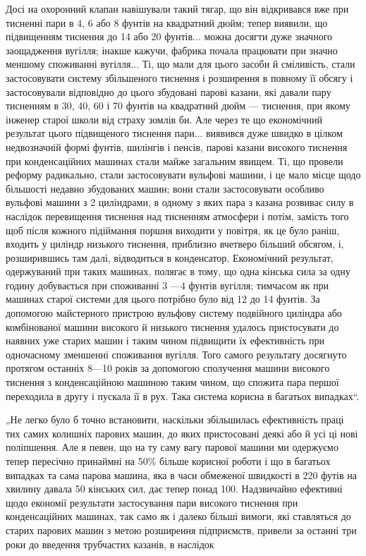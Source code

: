 \parcont{}  %
Досі на охоронний клапан навішували такий тягар, що він відкривався вже при тисненні пари в 4, 6 або
8 фунтів на квадратний
дюйм; тепер виявили, що підвищенням тиснення до 14 або 20 фунтів... можна досягти дуже значного
заощадження вугілля; інакше
кажучи, фабрика почала працювати при значно меншому споживанні вугілля... Ті, що мали для цього
засоби й сміливість, стали
застосовувати систему збільшеного тиснення і розширення в повному її обсягу і застосовували
відповідно до цього збудовані парові казани, які давали пару тисненням в 30, 40, 60 і 70 фунтів на
квадратний дюйм — тиснення, при якому інженер старої школи
від страху зомлів би. Але через те що економічний результат
цього підвищеного тиснення пари... виявився дуже швидко в цілком недвозначній формі фунтів, шилінгів
і пенсів, парові казани
високого тиснення при конденсаційних машинах стали майже загальним явищем. Ті, що провели реформу
радикально, стали застосовувати вульфові машини, і це мало місце щодо більшості недавно
збудованих машин; вони стали застосовувати особливо вульфові
машини з 2 циліндрами, в одному з яких пара з казана розвиває силу в наслідок перевищення тиснення
над тисненням атмосфери і потім, замість того щоб після кожного підіймання поршня
виходити у повітря, як це було раніш, входить у циліндр
низького тиснення, приблизно вчетверо більший обсягом, і, розширившись там далі, відводиться в
конденсатор. Економічний
результат, одержуваний при таких машинах, полягає в тому, що
одна кінська сила за одну годину добувається при споживанні
3 —4 фунтів вугілля; тимчасом як при машинах старої системи
для цього потрібно було від 12 до 14 фунтів. За допомогою
майстерного пристрою вульфову систему подвійного циліндра
або комбінованої машини високого й низького тиснення удалось
пристосувати до наявних уже старих машин і таким чином підвищити їх ефективність при одночасному
зменшенні споживання
вугілля. Того самого результату досягнуто протягом останніх
8—10 років за допомогою сполучення машини високого тиснення
з конденсаційною машиною таким чином, що спожита пара першої переходила в другу і пускала її в рух.
Така система корисна
в багатьох випадках“.

„Не легко було б точно встановити, наскільки збільшилась
ефективність праці тих самих колишніх парових машин, до
яких пристосовані деякі або й усі ці нові поліпшення. Але я певен, що на ту саму вагу парової машини
ми одержуємо тепер
пересічно принаймні на 50\% більше корисної роботи і що в багатьох випадках та сама парова машина,
яка в часи обмеженої
швидкості в 220 футів на хвилину давала 50 кінських сил, дає
тепер понад 100. Надзвичайно ефективні щодо економії результати
застосування пари високого тиснення при конденсаційних машинах, так само як і далеко більші вимоги,
які ставляться до старих парових машин з метою розширення підприємств, привели
за останні три роки до введення трубчастих казанів, в наслідок
\parbreak{}  %
